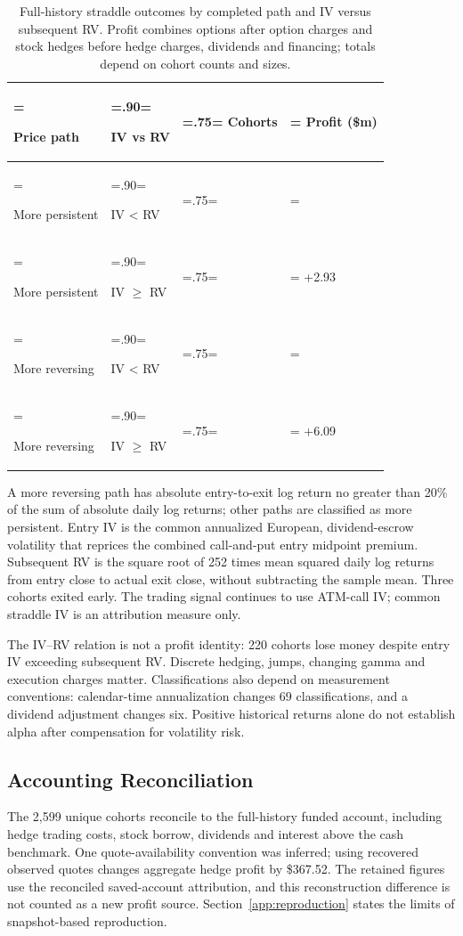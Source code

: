 \begin{table}[H]\centering\small
\caption{Full-history straddle outcomes by completed path and IV versus subsequent RV. Profit combines options after option charges and stock hedges before hedge charges, dividends and financing; totals depend on cohort counts and sizes.}\label{tab:straddle-ivrv-attribution}
\setlength{\tabcolsep}{5pt}\renewcommand{\arraystretch}{1.2}
\begin{tabularx}{\textwidth}{@{}>{\hsize=1.25\hsize\linewidth=\hsize\raggedright\arraybackslash}X>{\hsize=.90\hsize\linewidth=\hsize\raggedright\arraybackslash}X>{\hsize=.75\hsize\linewidth=\hsize\raggedleft\arraybackslash}X>{\hsize=1.10\hsize\linewidth=\hsize\raggedleft\arraybackslash}X@{}}\toprule
\textbf{Price path} & \textbf{IV vs RV} & \textbf{Cohorts} & \textbf{Profit (\$m)}\\\midrule
More persistent & IV < RV & 461 & -4.22\\
More persistent & IV \(\geq\) RV & 846 & +2.93\\
More reversing & IV < RV & 409 & -1.31\\
More reversing & IV \(\geq\) RV & 883 & +6.09\\
\bottomrule\end{tabularx}\end{table}

A more reversing path has absolute entry-to-exit log return no greater than 20\% of the sum of absolute daily log returns; other paths are classified as more persistent. Entry IV is the common annualized European, dividend-escrow volatility that reprices the combined call-and-put entry midpoint premium. Subsequent RV is the square root of 252 times mean squared daily log returns from entry close to actual exit close, without subtracting the sample mean. Three cohorts exited early. The trading signal continues to use ATM-call IV; common straddle IV is an attribution measure only.

The IV--RV relation is not a profit identity: 220 cohorts lose money despite entry IV exceeding subsequent RV. Discrete hedging, jumps, changing gamma and execution charges matter. Classifications also depend on measurement conventions: calendar-time annualization changes 69 classifications, and a dividend adjustment changes six. Positive historical returns alone do not establish alpha after compensation for volatility risk.

\subsection{Accounting Reconciliation}\label{app:attribution-reconciliation}

The 2,599 unique cohorts reconcile to the full-history funded account, including hedge trading costs, stock borrow, dividends and interest above the cash benchmark. One quote-availability convention was inferred; using recovered observed quotes changes aggregate hedge profit by \$367.52. The retained figures use the reconciled saved-account attribution, and this reconstruction difference is not counted as a new profit source. Section~\ref{app:reproduction} states the limits of snapshot-based reproduction.
\FloatBarrier
